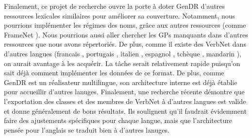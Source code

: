 Finalement, ce projet de recherche ouvre la porte à doter GenDR d'autres ressources lexicales similaires pour améliorer sa couverture. Notamment, nous pourrions implémenter les régimes des noms, grâce aux autres ressources (comme FrameNet \cite{FillmoreBackgroundFramenet2003a}). Nous pourrions aussi aller chercher les \acp{GP} manquants dans d'autres ressources que nous avons répertoriés. De plus, comme il existe des VerbNet dans d'autres langues (francais \citep{danlos:hal-01179175}, portugais \citep{ScartoncrosslinguisticVerbNetstylelexicon}, italien \citep{busso2016italian}, espagnol \citep{TauleAnCoraNetMappingSpanish2010}, tchèque \citep{pala2008can}, mandarin \citep{liu2008construction}), on aurait avantage à les acquérir. La tâche serait relativement rapide puisqu'on sait déjà comment implémenter les données de ce format. De plus, comme GenDR est un réalisateur multilingue, son architecture interne est déjà établie pour accueillir d'autres lanuges. Finalement, une recherche récente \citep{Majewska2017} démontre que l'exportation des classes et des membres de VerbNet \citep{SchulerVerbnetBroadcoverageComprehensive2005} à d'autres langues est valide et donne généralement de bons résultats. Ils soulignent qu'il faudrait évidemment faire des ajustements spécifiques pour chaque langue, mais que l'architecture pensée pour l'anglais se traduit bien à d'autres lanuges.

